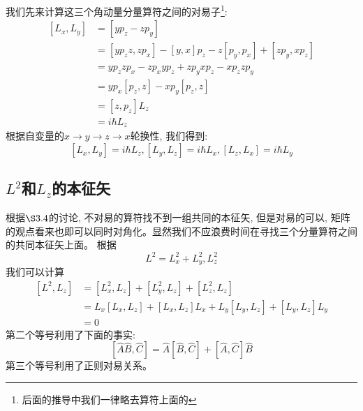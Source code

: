 \documentclass[a4paper,zihao=-4,linespread=1]{ctexrep}
\newenvironment{lequation}{\large\begin{equation}}{\end{equation}}
\begin{document}
    我们先来计算这三个角动量分量算符之间的对易子\footnote{后面的推导中我们一律略去算符上面的$\hat{}$}:
    \begin{align*}
        \left[L_x,L_y\right]&=\left[yp_z-zp_y\right]\\&=\left[yp_zz,zp_x\right]-\left[y,x\right]p_z-z\left[p_y,p_x\right]+\left[zp_y,xp_z\right]
        \\&=yp_zzp_x-zp_xyp_z+zp_yxp_z-xp_zzp_y\\&=yp_x\left[p_z,z\right]-xp_y\left[p_z,z\right]\\&=\left[z,p_z\right]L_z
        \\&=i\hbar L_z
    \end{align*}
    根据自变量的$x\to y\to z\to x$轮换性, 我们得到:
    \begin{lequation}
        \label{eq:4.48}
        \boxed{
            \left[L_x,L_y\right]=i\hbar L_z,\left[L_y,L_z\right]=i\hbar L_x,\left[L_z,L_x\right]=i\hbar L_y
        }
    \end{lequation}

    \subsection*{$L^2$和$L_z$的本征矢}
    根据$\S 3.4$的讨论, 不对易的算符找不到一组共同的本征矢, 但是对易的可以, 矩阵的观点看来也即可以同时对角化。显然我们不应浪费时间在寻找三个分量算符之间的共同本征矢上面。
    根据\[L^2=L_x^2+L_y^2,L_z^2\]我们可以计算
    \begin{align*}
        \left[L^2,L_z\right]&=\left[L_x^2,L_z\right]+\left[L_y^2,L_z\right]+\left[L_z^2,L_z\right]
        \\ &=L_x\left[L_x,L_z\right]+\left[L_x,L_z\right]L_x+L_y\left[L_y,L_z\right]+\left[L_y,L_z\right]L_y
        \\ &=0
    \end{align*}
    第二个等号利用了下面的事实:\[\left[\hat{A}\hat{B},\hat{C}\right]=\hat{A}\left[\hat{B},\hat{C}\right]+\left[\hat{A},\hat{C}\right]\hat{B}\]
    第三个等号利用了正则对易关系。
\end{document}
